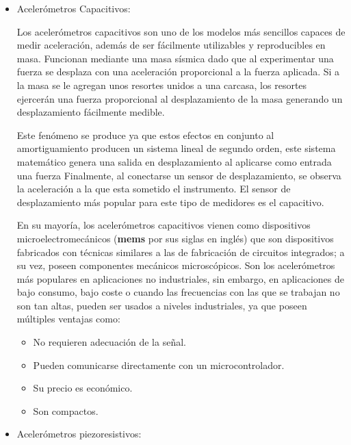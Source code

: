 \begin{itemize}
    \item  Acelerómetros Capacitivos:

        Los acelerómetros capacitivos son uno de los modelos más sencillos
        capaces de medir
        aceleración, además de ser fácilmente utilizables y reproducibles en masa.
        Funcionan mediante una masa sísmica dado que al  experimentar una fuerza
        se desplaza con una aceleración proporcional a la fuerza aplicada.
        Si a la masa se le agregan unos resortes unidos a una carcasa, los resortes
        ejercerán una fuerza proporcional al desplazamiento de la masa generando un
        desplazamiento fácilmente medible.

        Este fenómeno se produce ya que estos efectos en conjunto al
        amortiguamiento producen un sistema lineal de
        segundo orden, este sistema matemático genera una salida en desplazamiento
        al aplicarse como entrada una fuerza
         Finalmente, al conectarse un sensor de desplazamiento, se observa
        la aceleración a la que esta sometido el instrumento.
        El sensor de desplazamiento más
        popular para este tipo de medidores es el capacitivo.

        En su mayoría, los acelerómetros capacitivos vienen como dispositivos
        microelectromecánicos (\textbf{mems} por sus siglas en inglés) que son
        dispositivos
        fabricados con técnicas similares a las de fabricación de circuitos
        integrados; a su vez, poseen componentes mecánicos microscópicos. Son los
        acelerómetros más populares en aplicaciones no industriales, sin embargo,
        en aplicaciones de bajo consumo, bajo coste o cuando las frecuencias con
        las que se trabajan no son tan altas, pueden ser usados a niveles
        industriales, ya que poseen múltiples ventajas como:

        \begin{itemize}[noitemsep]
            \item No requieren adecuación de la señal.
            \item Pueden comunicarse directamente con un microcontrolador.
            \item Su precio es económico.
            \item Son compactos.
        \end{itemize}


    \item  Acelerómetros piezoresistivos:


\end{itemize}
